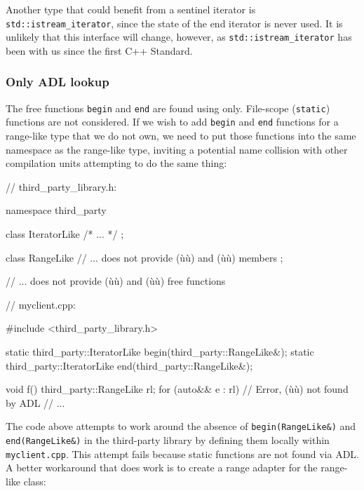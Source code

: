 {{{Another type that could benefit from a sentinel iterator is
\lstinline!std::istream_iterator!, since the state of the end iterator is
never used. It is unlikely that this interface will change, however, as
\lstinline!std::istream_iterator! has been with us since the first C++
Standard.

\subsubsection[Only ADL lookup]{Only ADL lookup}\label{only-adl-lookup}

The free functions \lstinline!begin! and \lstinline!end! are found using
 only. File-scope
(\lstinline!static!) functions are not considered. If we wish to add
\lstinline!begin! and \lstinline!end! functions for a range-like type that we
do not own, we need to put those functions into the same namespace as
the range-like type, inviting a potential name collision with other
compilation units attempting to do the same thing:

\begin{emcppslisting}[emcppsbatch=e8]
// third_party_library.h:

namespace third_party
{

    class IteratorLike { /* ... */ };

    class RangeLike
    {
        // ... does not provide (ù{}ù) and (ù{}ù) members
    };

    // ... does not provide (ù{}ù) and (ù{}ù) free functions
}
\end{emcppslisting}
\newpage%
\begin{emcppslisting}[emcppsbatch=e8]
// myclient.cpp:

#include <third_party_library.h>

static third_party::IteratorLike begin(third_party::RangeLike&);
static third_party::IteratorLike end(third_party::RangeLike&);

void f()
{
    third_party::RangeLike rl;
    for (auto&& e : rl)  // Error, (ù{}ù) not found by ADL
    {
        // ...
    }
}
\end{emcppslisting}
    

\noindent The code above attempts to work around the absence of
\lstinline!begin(RangeLike&)! and \lstinline!end(RangeLike&)! in the
third-party library by defining them locally within
\lstinline!myclient.cpp!. This attempt fails because static functions are
not found via ADL. A better workaround that does work is to create a
range adapter for the range-like class:

}}}
